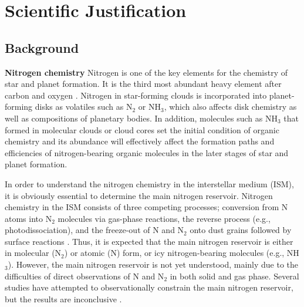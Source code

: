 \documentclass[12pt,a4paper]{article}  %
\newcommand{\ammonia}{NH$_3$\xspace}
\begin{document}
\pagestyle{plain}
 



\section{Scientific Justification}
\subsection{Background}
\noindent \textbf{Nitrogen chemistry} \quad Nitrogen is one of the key elements for the chemistry of star and planet formation. It is the third most abundant heavy element after carbon and oxygen \citep{Przybilla08}. Nitrogen in star-forming clouds is incorporated into planet-forming disks as volatiles such as N$_2$ or NH$_3$, which also affects disk chemistry \citep[e.g.,][]{Schwarz14} as well as compositions of planetary bodies. %
In addition, molecules such as \ammonia that formed in molecular clouds or cloud cores set the initial condition of organic chemistry and its abundance will effectively affect the formation paths and efficiencies of nitrogen-bearing organic molecules in the later stages of star and planet formation.

In order to understand the nitrogen chemistry in the interstellar medium (ISM), it is obviously essential to determine the main nitrogen reservoir. Nitrogen chemistry in the ISM consists of three competing processes; conversion from N atoms into N$_2$ molecules via gas-phase reactions, the reverse process (e.g., photodissociation), and the freeze-out of N and N$_2$ onto dust grains followed by surface reactions \citep[e.g.,][]{Daranlot12}. Thus, it is expected that the main nitrogen reservoir is either in molecular (N$_2$) or atomic (N) form, or icy nitrogen-bearing molecules (e.g., \ammonia). However, the main nitrogen reservoir is not yet understood, mainly due to the difficulties of direct observations of N and N$_2$ in both solid and gas phase. Several studies have attempted to observationally constrain the main nitrogen reservoir, but the results are inconclusive \citep[e.g.,][]{Oberg11, Maret06}.
\end{document}
